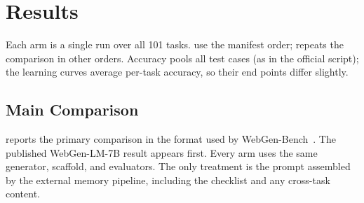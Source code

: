 \chapter{Results}
\label{chap:results}

Each arm is a single run over all 101 tasks.  use the manifest order;  repeats the comparison in other orders. Accuracy pools all test cases (as in the official script); the learning curves average per-task accuracy, so their end points differ slightly.

\section{Main Comparison}\label{sec:main}
 reports the primary comparison in the format used by WebGen-Bench~\cite{lu2025webgenbench}. The published WebGen-LM-7B result appears first. Every arm uses the same generator, scaffold, and evaluators. The only treatment is the prompt assembled by the external memory pipeline, including the checklist and any cross-task content.

